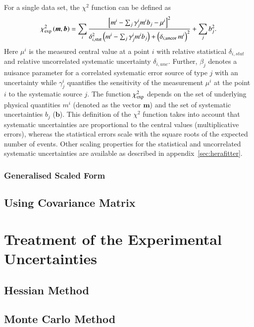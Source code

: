\documentclass[11pt,a4paper]{article}
\begin{document}
For a single data set, 
 the $\chi^2$ function can be defined as~\cite{H1:2009bp}
%
\begin{equation}
 \chi^2_{\rm exp}\left(\boldsymbol{m},\boldsymbol{b}\right) = %
 \sum_i
 \frac{\left[m^i
- \sum_j \gamma^i_j m^i b_j  - {\mu^i} \right]^2}
{ \textstyle \delta^2_{i,{\rm stat}}\left(m^i -  \sum_j \gamma^i_j m^i b_j\right)+
\left(\delta_{i,{\rm uncor}}\,  m^i\right)^2}
 + \sum_j b^2_j.
\label{eq:ave}\end{equation}
%
Here ${\mu^i}$ is the  measured central value  at a point $i$ 
with  relative statistical $\delta_{i,stat}$ 
and relative uncorrelated systematic uncertainty $\delta_{i,unc}$.
Further, $\beta_j$ denotes a nuisance parameter for
 a correlated systematic error  source of type $j$ with an uncertainty
 while
$\gamma^i_j$ 
quantifies the sensitivity of the
measurement ${\mu^i}$ at the point $i$ to the systematic source $j$. 
The function $\chi^2_{\rm exp}$ depends on the set of
underlying physical quantities $m^i$ 
(denoted as the vector $\boldsymbol{m}$) and 
 the set of systematic uncertainties $b_j$ ($\boldsymbol{b}$).
This definition of the $\chi^2$ function takes into account that
systematic uncertainties are proportional to the central values 
(multiplicative errors), whereas the statistical errors scale 
with the square roots of the expected number of events. 
Other scaling properties for the statistical and uncorrelated
systematic uncertainties are available as described in appendix~\ref{sec:herafitter}.
\subsubsection{Generalised Scaled Form}

\subsection{Using Covariance Matrix}
\section{Treatment of the Experimental Uncertainties}
\subsection{Hessian Method}

\subsection{Monte Carlo Method}
\end{document}
